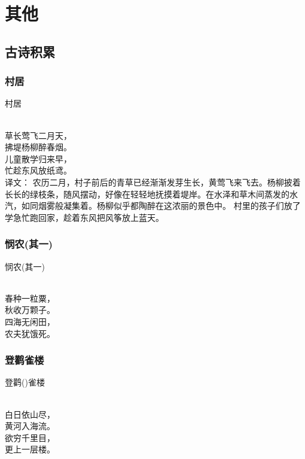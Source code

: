 \chapter{其他}
\section{古诗积累}
\subsection{村居}

	\noindent 村居
	
	  \\
	
	\noindent 草长莺飞二月天，\\拂堤杨柳醉春烟。\\
	儿童散学归来早，\\忙趁东风放纸鸢。\\


译文：
农历二月，村子前后的青草已经渐渐发芽生长，黄莺飞来飞去。杨柳披着长长的绿枝条，随风摆动，好像在轻轻地抚摸着堤岸。在水泽和草木间蒸发的水汽，如同烟雾般凝集着。杨柳似乎都陶醉在这浓丽的景色中。
村里的孩子们放了学急忙跑回家，趁着东风把风筝放上蓝天。

\subsection{悯农(其一)}

\noindent 悯农(其一)

  \\

\noindent 春种一粒粟，\\秋收万颗子。\\
四海无闲田，\\农夫犹饿死。

\subsection{登鹳雀楼}

\noindent 登鹳()雀楼

  \\

\noindent 白日依山尽，\\黄河入海流。\\
欲穷千里目，\\更上一层楼。

